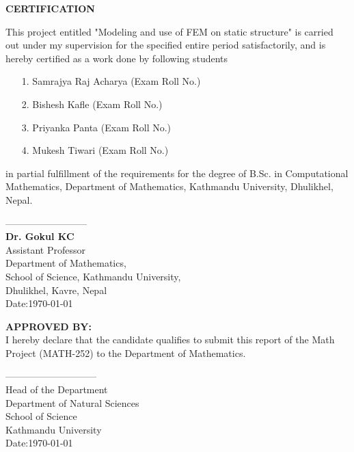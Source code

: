 



\begin{center}
	{\Large{\bf{ CERTIFICATION}}}
\end{center}


\noindent
This project entitled "Modeling and use of FEM on static structure" is carried out  under my supervision for the specified entire period satisfactorily, and is hereby certified as a work done by following students
\begin{itemize}
\item[1.] Samrajya Raj Acharya (Exam Roll No.)
\item[2.] Bishesh Kafle (Exam Roll No.)
\item[3.] Priyanka Panta (Exam Roll No.)
\item[4.] Mukesh Tiwari (Exam Roll No.)
\end{itemize}
 in partial fulfillment of the requirements for the degree of B.Sc. in Computational Mathematics, Department of Mathematics, Kathmandu University, Dhulikhel, Nepal.

\vspace{1.0cm}

\noindent
--------------------------\\
{\bf Dr. Gokul KC}\\
Assistant Professor \\
Department of Mathematics,\\
School of Science, Kathmandu University,\\
Dhulikhel, Kavre, Nepal\\
Date:\today

\vspace{1cm}

\noindent
{\bf APPROVED BY:}\\
I hereby declare that the candidate qualifies to submit this  report of the  Math Project (MATH-252) to the Department of Mathematics. 



\vspace{2cm}

\noindent
-----------------------------\\
Head of the Department\\
Department of Natural Sciences\\
School of Science\\
Kathmandu University\\
Date:\today
  